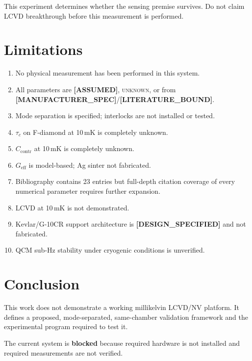 \documentclass[12pt,a4paper]{article}
\newcommand{\unknown}{\textsc{unknown}}
\newcommand{\assumed}{\textbf{[ASSUMED]}}
\newcommand{\designspec}{\textbf{[DESIGN\_SPECIFIED]}}
\newcommand{\mfrspec}{\textbf{[MANUFACTURER\_SPEC]}}
\newcommand{\litbound}{\textbf{[LITERATURE\_BOUND]}}
\begin{document}
This experiment determines whether the sensing premise survives.
Do not claim LCVD breakthrough before this measurement is performed.

\section{Limitations}
\label{sec:limitations}

\begin{enumerate}[noitemsep]
  \item No physical measurement has been performed in this system.
  \item All parameters are \assumed{}, \unknown{}, or from \mfrspec{}/\litbound{}.
  \item Mode separation is specified; interlocks are not installed or tested.
  \item $\tau_c$ on F-diamond at 10\,mK is completely unknown.
  \item $C_\mathrm{contr}$ at 10\,mK is completely unknown.
  \item $G_\mathrm{eff}$ is model-based; Ag sinter not fabricated.
  \item Bibliography contains 23 entries but full-depth citation coverage
        of every numerical parameter requires further expansion.
  \item LCVD at 10\,mK is not demonstrated.
  \item Kevlar/G-10CR support architecture is \designspec{} and not fabricated.
  \item QCM sub-Hz stability under cryogenic conditions is unverified.
\end{enumerate}

\section{Conclusion}
\label{sec:conclusion}

This work does not demonstrate a working millikelvin LCVD/NV platform.
It defines a proposed, mode-separated, same-chamber validation framework
and the experimental program required to test it.

The current system is \textbf{blocked} because required hardware is not
installed and required measurements are not verified.
\end{document}
